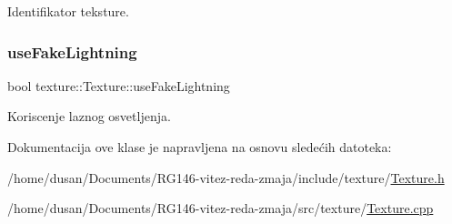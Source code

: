 Identifikator teksture. 

\mbox{\label{classtexture_1_1Texture_ac8ea906062f8a7c558134072955af52f}} 
\subsubsection{\texorpdfstring{use\+Fake\+Lightning}{useFakeLightning}}
{\footnotesize\ttfamily bool texture\+::\+Texture\+::use\+Fake\+Lightning\hspace{0.3cm}{\ttfamily [private]}}



Koriscenje laznog osvetljenja. 



Dokumentacija ove klase je napravljena na osnovu sledećih datoteka\+:\begin{DoxyCompactItemize}
\item 
/home/dusan/\+Documents/\+R\+G146-\/vitez-\/reda-\/zmaja/include/texture/\hyperlink{Texture_8h}{Texture.\+h}\item 
/home/dusan/\+Documents/\+R\+G146-\/vitez-\/reda-\/zmaja/src/texture/\hyperlink{Texture_8cpp}{Texture.\+cpp}\end{DoxyCompactItemize}
